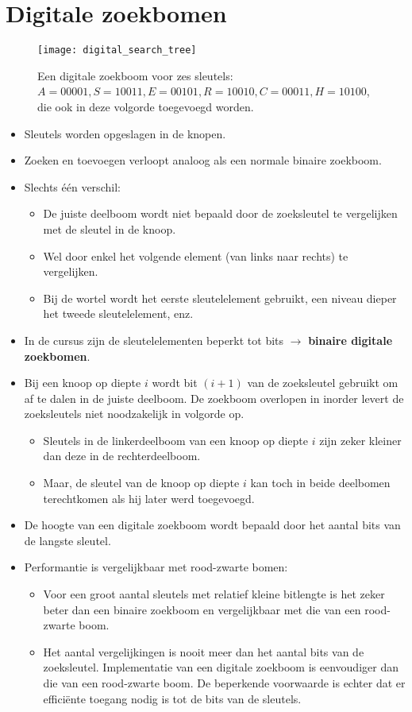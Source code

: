 \section{Digitale zoekbomen}
\begin{figure}[ht]
    \centering
    \texttt{[image: digital\_search\_tree]}
    \caption{Een digitale zoekboom voor zes sleutels: $A = 00001, S = 10011, E = 00101, R = 10010, C = 00011, H = 10100$, die ook in deze volgorde toegevoegd worden.}
    \label{fig:digital_search_tree}
\end{figure}
\begin{itemize}
    \item Sleutels worden opgeslagen in de knopen.
    \item Zoeken en toevoegen verloopt analoog als een normale binaire zoekboom.
    \item Slechts één verschil: 
    \begin{itemize}
        \item De juiste deelboom wordt niet bepaald door de zoeksleutel te vergelijken met de sleutel in de knoop.
        \item Wel door enkel het volgende element (van links naar rechts) te vergelijken.
        \item Bij de wortel wordt het eerste sleutelelement gebruikt, een niveau dieper het tweede sleutelelement, enz.
    \end{itemize}
    \item In de cursus zijn de sleutelelementen beperkt tot bits $\rightarrow$ \textbf{binaire digitale zoekbomen}.
    \item Bij een knoop op diepte $i$ wordt bit $(i + 1)$ van de zoeksleutel gebruikt om af te dalen in de juiste deelboom.
    \alert De zoekboom overlopen in inorder levert de zoeksleutels niet noodzakelijk in volgorde op.
    \begin{itemize}
        \item Sleutels in de linkerdeelboom van een knoop op diepte $i$ zijn zeker kleiner dan deze in de rechterdeelboom.
        \item Maar, de sleutel van de knoop op diepte $i$ kan toch in beide deelbomen terechtkomen als hij later werd toegevoegd.
    \end{itemize}
    \item De hoogte van een digitale zoekboom wordt bepaald door het aantal bits van de langste sleutel.
    \item Performantie is vergelijkbaar met rood-zwarte bomen:
    \begin{itemize}
        \item Voor een groot aantal sleutels met relatief kleine bitlengte is het zeker beter dan een binaire zoekboom en vergelijkbaar met die van een rood-zwarte boom.
        \item Het aantal vergelijkingen is nooit meer dan het aantal bits van de zoeksleutel.
        \good Implementatie van een digitale zoekboom is eenvoudiger dan die van een rood-zwarte boom.
        \alert De beperkende voorwaarde is echter dat er efficiënte toegang nodig is tot de bits van de sleutels.
    \end{itemize}
\end{itemize}

